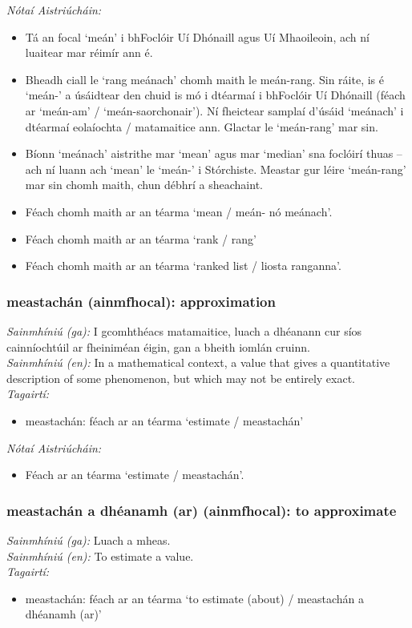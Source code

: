  \noindent \textit{Nótaí Aistriúcháin:}
\begin{itemize}
	\item Tá an focal `meán' i bhFoclóir Uí Dhónaill agus Uí Mhaoileoin, ach ní luaitear mar réimír ann é.
	\item Bheadh ciall le `rang meánach' chomh maith le meán-rang. Sin ráite, is é `meán-' a úsáidtear den chuid is mó i dtéarmaí i bhFoclóir Uí Dhónaill (féach ar `meán-am' / `meán-saorchonair'). Ní fheictear samplaí d'úsáid `meánach' i dtéarmaí eolaíochta / matamaitice ann. Glactar le `meán-rang' mar sin.
	\item Bíonn `meánach' aistrithe mar `mean' agus mar `median' sna foclóirí thuas -- ach ní luann ach `mean' le `meán-' i Stórchiste. Meastar gur léire `meán-rang' mar sin chomh maith, chun débhrí a sheachaint.
	\item Féach chomh maith ar an téarma `mean / meán- nó meánach'.
	\item Féach chomh maith ar an téarma `rank / rang'
	\item Féach chomh maith ar an téarma `ranked list / liosta ranganna'.
\end{itemize}


\subsubsection*{meastachán (ainmfhocal): approximation}
 \noindent \textit{Sainmhíniú (ga):} I gcomhthéacs matamaitice, luach a dhéanann cur síos cainníochtúil ar fheiniméan éigin, gan a bheith iomlán cruinn.
\\
 \noindent \textit{Sainmhíniú (en):} In a mathematical context, a value that gives a quantitative description of some phenomenon, but which may not be entirely exact.
\\
 \noindent \textit{Tagairtí:}
\begin{itemize}
	\item meastachán: féach ar an téarma `estimate / meastachán'
\end{itemize}

 \noindent \textit{Nótaí Aistriúcháin:}
\begin{itemize}
	\item Féach ar an téarma `estimate / meastachán'.
\end{itemize}


\subsubsection*{meastachán a dhéanamh (ar) (ainmfhocal): to approximate}
 \noindent \textit{Sainmhíniú (ga):} Luach a mheas.
\\
 \noindent \textit{Sainmhíniú (en):} To estimate a value.
\\
 \noindent \textit{Tagairtí:}
\begin{itemize}
	\item meastachán: féach ar an téarma `to estimate (about) / meastachán a dhéanamh (ar)'
\end{itemize}

